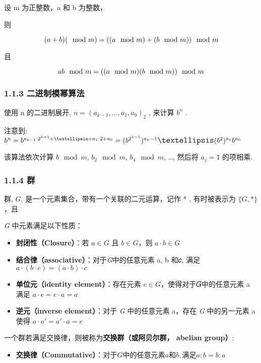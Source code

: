 设 m 为正整数，a 和 b 为整数，

则

\[
\huge
(a + b) (\mod m) = ((a\mod m) + (b\mod m))\mod m 
\]

且

\[
\huge
ab\mod m = ((a\mod m) (b\mod m))\mod m
\]

\subsubsection{1.1.3
二进制模幂算法}\label{ux4e8cux8fdbux5236ux6a21ux5e42ux7b97ux6cd5}

使用 n 的二进制展开, \(n = (a_{k-1},…,a_1,a_0)_2\) , 来计算 \(b^n\) .

注意到:
\(\large b^n=b^{a_{k-1}\cdot 2^{k+1}+…+a_1\cdot 2+a_0}=(b^{2^{k-1}})^{a_k-1}…(b^2)^{a_1}b^{a_0}\)

该算法依次计算 \(b\mod m\), \(b_2\mod m\), \(b_4\mod m\), \ldots, 然后将
\(a_j = 1\) 的项相乘.

\subsubsection{1.1.4 群}\label{ux7fa4}

群, \(G\), 是一个元素集合，带有一个关联的二元运算，记作 * , 有时被表示为
\(\{G, * \}\)，且

\emph{G} 中元素满足以下性质：

\begin{itemize}
\tightlist
\item
  \textbf{封闭性（Closure）}：若 \(a \in G\) 且 \(b \in G\)，则
  \(a \cdot b \in G\)
\item
  \textbf{结合律（associative）}：对于\emph{G}中的任意元素 a, b 和𝑐,
  满足 \(a \cdot (b \cdot c) = (a \cdot b) \cdot c\)
\item
  \textbf{单位元（identity element）}：存在元素
  \(e \in G\)，使得对于𝐺中的任意元素 a 满足
  \(a \cdot 𝑒 = 𝑒 \cdot a = a\)
\item
  \textbf{逆元（inverse element）}：对于 \emph{G} 中的任意元素 a，存在
  \emph{G} 中的另一元素 a 使得 \(a\cdot a'=a'\cdot a=e\)
\end{itemize}

一个群若满足交换律，则被称为\textbf{交换群（或阿贝尔群， abelian
group）}:

\begin{itemize}
\tightlist
\item
  \textbf{交换律（Commutative）}：\(对于𝐺中的任意元素a和b, 满足a : b = b : a\)
\end{itemize}

